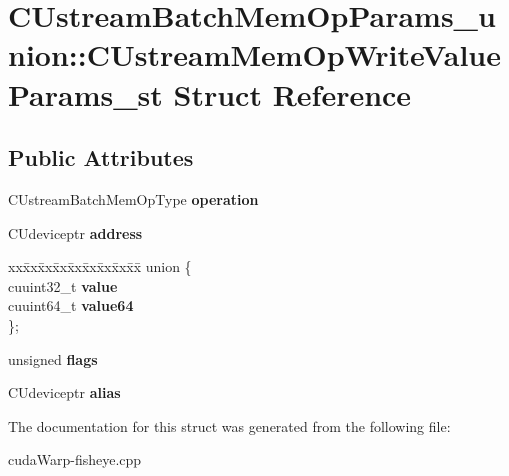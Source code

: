 \hypertarget{structCUstreamBatchMemOpParams__union_1_1CUstreamMemOpWriteValueParams__st}{}\section{C\+Ustream\+Batch\+Mem\+Op\+Params\+\_\+union\+:\+:C\+Ustream\+Mem\+Op\+Write\+Value\+Params\+\_\+st Struct Reference}
\label{structCUstreamBatchMemOpParams__union_1_1CUstreamMemOpWriteValueParams__st}
\subsection*{Public Attributes}
\begin{DoxyCompactItemize}
\item 
C\+Ustream\+Batch\+Mem\+Op\+Type {\bfseries operation}\hypertarget{structCUstreamBatchMemOpParams__union_1_1CUstreamMemOpWriteValueParams__st_a822321a2204e2e8869373da6b544d543}{}\label{structCUstreamBatchMemOpParams__union_1_1CUstreamMemOpWriteValueParams__st_a822321a2204e2e8869373da6b544d543}

\item 
C\+Udeviceptr {\bfseries address}\hypertarget{structCUstreamBatchMemOpParams__union_1_1CUstreamMemOpWriteValueParams__st_ac722aa0daf87f160534e4864d4bfcba9}{}\label{structCUstreamBatchMemOpParams__union_1_1CUstreamMemOpWriteValueParams__st_ac722aa0daf87f160534e4864d4bfcba9}

\item 
\begin{tabbing}
xx\=xx\=xx\=xx\=xx\=xx\=xx\=xx\=xx\=\kill
union \{\\
\>cuuint32\_t {\bfseries value}\\
\>cuuint64\_t {\bfseries value64}\\
\}; \hypertarget{structCUstreamBatchMemOpParams__union_1_1CUstreamMemOpWriteValueParams__st_a0c6920f130cd1c36d18c736152e7bdd2}{}\label{structCUstreamBatchMemOpParams__union_1_1CUstreamMemOpWriteValueParams__st_a0c6920f130cd1c36d18c736152e7bdd2}
\\

\end{tabbing}\item 
unsigned {\bfseries flags}\hypertarget{structCUstreamBatchMemOpParams__union_1_1CUstreamMemOpWriteValueParams__st_a38b242eea8c0fe92f533d268eeca4ddc}{}\label{structCUstreamBatchMemOpParams__union_1_1CUstreamMemOpWriteValueParams__st_a38b242eea8c0fe92f533d268eeca4ddc}

\item 
C\+Udeviceptr {\bfseries alias}\hypertarget{structCUstreamBatchMemOpParams__union_1_1CUstreamMemOpWriteValueParams__st_a910dd5a1f47bf6ef3efa96e4a51cd2c0}{}\label{structCUstreamBatchMemOpParams__union_1_1CUstreamMemOpWriteValueParams__st_a910dd5a1f47bf6ef3efa96e4a51cd2c0}

\end{DoxyCompactItemize}


The documentation for this struct was generated from the following file\+:\begin{DoxyCompactItemize}
\item 
cuda\+Warp-\/fisheye.\+cpp\end{DoxyCompactItemize}
